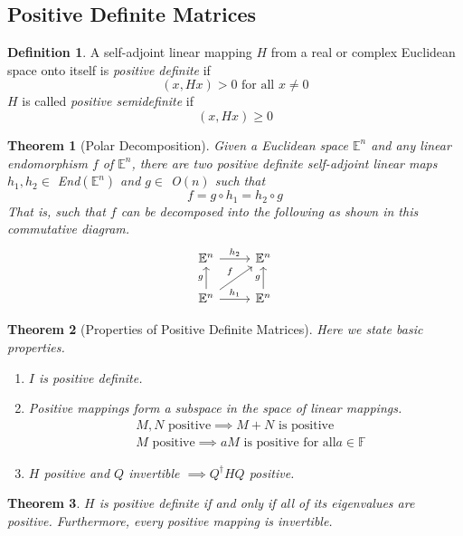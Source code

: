 \documentclass{article}
\newtheorem{theorem}{Theorem}[section]
\theoremstyle{remark}
\theoremstyle{definition}
\newtheorem{definition}{Definition}[section]
\begin{document}
\subsection{Positive Definite Matrices}
\begin{definition}
A self-adjoint linear mapping $H$ from a real or complex Euclidean space onto itself is \textit{positive definite} if 
\[(x, H x) > 0 \text{ for all } x \neq 0\]
$H$ is called \textit{positive semidefinite} if 
\[(x, H x) \geq 0\]
\end{definition}

\begin{theorem}[Polar Decomposition]
Given a Euclidean space $\mathbb{E}^n$ and any linear endomorphism $f$ of $\mathbb{E}^n$, there are two positive definite self-adjoint linear maps $h_1, h_2 \in$ End$(\mathbb{E}^n)$ and $g \in$ O$(n)$ such that
\[f = g \circ h_1 = h_2 \circ g\]
That is, such that $f$ can be decomposed into the following as shown in this commutative diagram. 
\[\begin{tikzcd}
\mathbb{E}^n \arrow{r}{h_2} & \mathbb{E}^n \\
\mathbb{E}^n \arrow{u}{g} \arrow{ur}{f} \arrow{r}{h_1} & \mathbb{E}^n \arrow{u}{g}
\end{tikzcd}\]
\end{theorem}

\begin{theorem}[Properties of Positive Definite Matrices] Here we state basic properties. 
\begin{enumerate}
    \item $I$ is positive definite. 
    \item Positive mappings form a subspace in the space of linear mappings. 
\begin{align*}
    &M, N \text{ positive} \implies M + N \text{ is positive} \\
    &M \text{ positive} \implies a M \text{ is positive for all} a \in \mathbb{F}
\end{align*}
    \item $H$ positive and $Q$ invertible $\implies Q^\dagger H Q$ positive. 
\end{enumerate}
\end{theorem}

\begin{theorem}
$H$ is positive definite if and only if all of its eigenvalues are positive. Furthermore, every positive mapping is invertible.
\end{theorem}
\end{document}
